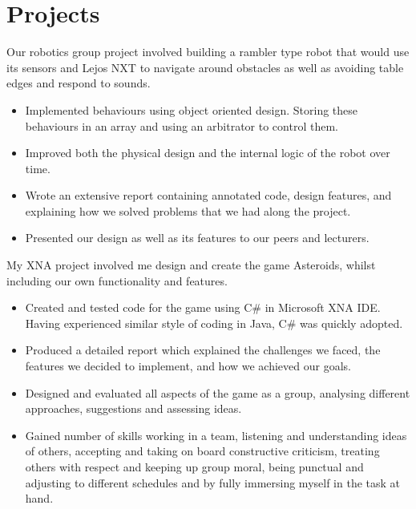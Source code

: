 \documentclass[10pt,a4paper]{moderncv}
\begin{document}
        \section{Projects}
        {
        Our robotics group project involved building a rambler type robot that would use its sensors and Lejos NXT to navigate around obstacles as well as avoiding table edges and respond to sounds.
        \begin{itemize}
            \item Implemented behaviours using object oriented design. Storing these behaviours in an array and using an arbitrator to control them.
            \item Improved both the physical design and the internal logic of the robot over time.
            \item Wrote an extensive report containing annotated code, design features, and explaining how we solved problems that we had along the project.
            \item Presented our design as well as its features to our peers and lecturers.
        \end{itemize}
        }
        {
        My XNA project involved me design and create the game Asteroids, whilst including our own functionality and features.
        \begin{itemize}
            \item Created and tested code for the game using C\# in Microsoft XNA IDE. Having experienced similar style of coding in Java, C\# was quickly adopted.
            \item Produced a detailed report which explained the challenges we faced, the features we decided to implement, and how we achieved our goals.
            \item Designed and evaluated all aspects of the game as a group, analysing different approaches, suggestions and assessing ideas.
            \item Gained number of skills working in a team, listening and understanding ideas of others, accepting and taking on board constructive criticism, treating others with respect and keeping up group moral, being punctual and adjusting to different schedules and by fully immersing myself in the task at hand.
        \end{itemize}
        }
\end{document}
